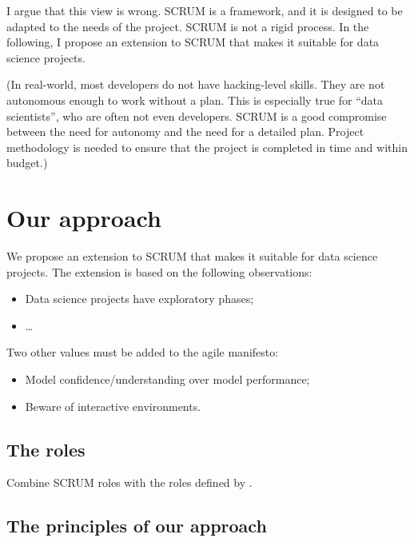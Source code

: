 I argue that this view is wrong.  SCRUM is a framework, and it is designed to be adapted to
the needs of the project.  SCRUM is not a rigid process.  In the following, I propose an
extension to SCRUM that makes it suitable for data science projects.

(In real-world, most developers do not have hacking-level skills.  They are not autonomous
enough to work without a plan.  This is especially true for ``data scientists'', who are
often not even developers.  SCRUM is a good compromise between the need for autonomy and
the need for a detailed plan.  Project methodology is needed to ensure that the project is
completed in time and within budget.)

\section{Our approach}

We propose an extension to SCRUM that makes it suitable for data science projects.  The
extension is based on the following observations:
\begin{itemize}
  \item Data science projects have exploratory phases;
  \item \dots
\end{itemize}

Two other values must be added to the agile manifesto:
\begin{itemize}
  \item Model confidence/understanding over model performance;
  \item Beware of interactive environments.
\end{itemize}

\subsection{The roles}

Combine SCRUM roles with the roles defined by \textcite{Zumel2019}.

\subsection{The principles of our approach}

